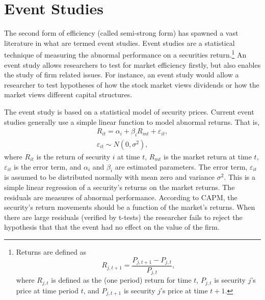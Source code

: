 \section{Event Studies}

The second form of efficiency (called semi-strong form) has spawned a
vast literature in what are termed event studies.  Event studies
are a
statistical technique of measuring the abnormal performance on a
securities return.\footnote{Returns are defined as
\begin{equation}
R_{j,t+1}=\frac{P_{j,t+1}-P_{j,t}}{P_{j,t}},
\end{equation}
where $R_{j,t}$
is defined as the (one period) return for time $t$, $P_{j,t}$
is security $j$'s price at time period $t$, and $P_{j,t+1}$
 is security $j$'s price at
time $t+1$.}  An event study allows researchers to test for
market efficiency firstly, but also enables the study of
firm related issues.  For instance, an event study would
allow a researcher to test hypotheses of how the stock
market views dividends or how the market views different
capital structures.
  

The
event study is based on a statistical model of security prices.
Current event studies generally use a simple linear function to
model abnormal returns.  That is,
\begin{eqnarray}
R_{it}=\alpha_i+\beta_i R_{mt}+\varepsilon_{it},  \\
\varepsilon_{it} \sim N(0,\sigma^{2}),
\end{eqnarray}
where $R_{it}$ is the return of security $i$ at time $t$,
$R_{mt}$ is the market return at time $t$, 
$\varepsilon_{it}$ is the error term, and $\alpha_i$ and 
$\beta_i$ are estimated parameters.  The error term,
$\varepsilon_{it}$ is assumed to be distributed normally
with mean zero and variance $\sigma^{2}$.  This is a simple linear
regression of a security's returns on the market returns. 
The residuals are measures of abnormal performance. 
According to CAPM, the security's return movements should be a
function of the market's returns.  When there are large
residuals (verified by t-tests) the researcher
fails to reject the hypothesis that that the event had no
effect on the value of the firm.

